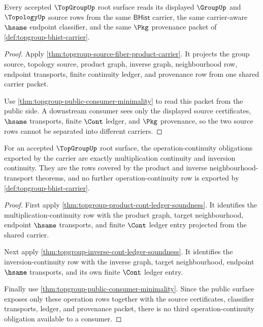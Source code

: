 \begin{theorem}
\label{thm:topgroup-source-compatibility-obligation}
Every accepted $\TopGroupUp$ root surface reads its displayed $\GroupUp$ and
$\TopologyUp$ source rows from the same $\mathsf{BHist}$ carrier, the same
carrier-aware $\hsame$ endpoint classifier, and the same $\Pkg$ provenance
packet of \autoref{def:topgroup-bhist-carrier}.
\end{theorem}
\begin{proof}
Apply \autoref{thm:topgroup-source-fiber-product-carrier}. It projects the
group source, topology source, product graph, inverse graph, neighbourhood row,
endpoint transports, finite continuity ledger, and provenance row from one
shared carrier packet.

Use \autoref{thm:topgroup-public-consumer-minimality} to read this packet from
the public side. A downstream consumer sees only the displayed source
certificates, $\hsame$ transports, finite $\Cont$ ledger, and $\Pkg$ provenance,
so the two source rows cannot be separated into different carriers.
\end{proof}

\begin{theorem}
\label{thm:topgroup-operation-continuity-obligation}
For an accepted $\TopGroupUp$ root surface, the operation-continuity obligations
exported by the carrier are exactly multiplication continuity and inversion
continuity. They are the rows covered by the product and inverse
neighbourhood-transport theorems, and no further operation-continuity row is
exported by \autoref{def:topgroup-bhist-carrier}.
\end{theorem}
\begin{proof}
First apply \autoref{thm:topgroup-product-cont-ledger-soundness}. It identifies
the multiplication-continuity row with the product graph, target neighbourhood,
endpoint $\hsame$ transports, and finite $\Cont$ ledger entry projected from
the shared carrier.

Next apply \autoref{thm:topgroup-inverse-cont-ledger-soundness}. It identifies
the inversion-continuity row with the inverse graph, target neighbourhood,
endpoint $\hsame$ transports, and its own finite $\Cont$ ledger entry.

Finally use \autoref{thm:topgroup-public-consumer-minimality}. Since the public
surface exposes only these operation rows together with the source
certificates, classifier transports, ledger, and provenance packet, there is no
third operation-continuity obligation available to a consumer.
\end{proof}

